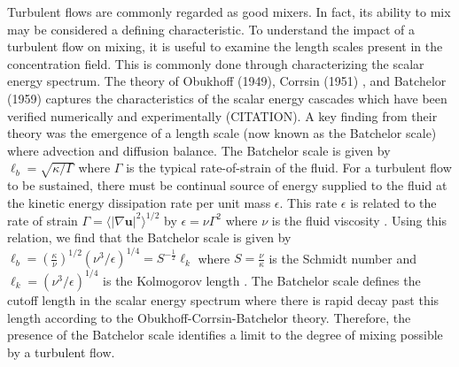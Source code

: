 
Turbulent flows are commonly regarded as good mixers. In fact, its ability to mix may be considered a defining characteristic. To understand the impact of a turbulent flow on mixing, it is useful to examine the length scales present in the concentration field. This is commonly done through characterizing the scalar energy spectrum. The theory of Obukhoff (1949)\cite{Obukhov1949},  Corrsin (1951) \cite{Corrsin1951}, and Batchelor (1959)\cite{Batchelor1959a} captures the characteristics of the scalar energy cascades which have been verified numerically\cite{Eswaran1988,Holzer1994b,Shraiman2000a} and experimentally (CITATION). A key finding from their theory was the emergence of a length scale (now known as the Batchelor scale) where  advection and diffusion balance. The Batchelor scale is given by  $\ell_{b}= \sqrt{\kappa / \Gamma}$ where $\Gamma$ is the typical rate-of-strain of the fluid. For a turbulent flow to be sustained, there must be continual source of energy supplied to the fluid at the kinetic energy dissipation rate per unit mass $\epsilon$. This rate $\epsilon$ is related to the rate of strain $\Gamma = \langle |\nabla \mathbf{u}|^2 \rangle ^{1/2} $ by $\epsilon = \nu \Gamma^2$ where $\nu$ is the fluid viscosity \cite{Doering}. Using this relation, we find that the Batchelor scale is given by $\ell_{b}=\left(\frac{\kappa}{\nu}\right)^{1/2}\left(\nu^3/\epsilon\right)^{1/4}=S^{-\frac{1}{2}}\ell_{k}$ where $S=\frac{\nu}{\kappa}$ is the Schmidt number and  $\ell_{k}=\left(\nu^3/\epsilon\right)^{1/4}$ is the Kolmogorov length \cite{Dimotakis2005,Kolmogorov1941}.  The Batchelor scale defines the cutoff length in the scalar energy spectrum where there is rapid decay past this length according to the Obukhoff-Corrsin-Batchelor theory. Therefore, the presence of the Batchelor scale identifies a limit to the degree of mixing possible by a turbulent flow. 
